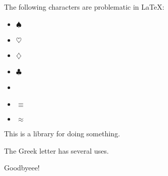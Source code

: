 \documentclass[letterpaper,10pt,english]{sphinxmanual}
\begin{document}
\cleardoublepage

The \hspace{0pt}following \hspace{0pt}characters \hspace{0pt}are \hspace{0pt}problematic \hspace{0pt}in \hspace{0pt}LaTeX:
\begin{itemize}
\item {}
 $\spadesuit$

\item {}
 $\heartsuit$

\item {}
 $\diamondsuit$

\item {}
 $\clubsuit$

\item {}
\textmu{}

\item {}
 $\equiv$

\item {}
 $\approx$

\end{itemize}

This is a \textmu{}\sphinxhyphen{}library for doing something.

The Greek letter \textmu{} has several uses.


\vspace{10px}


\clearpage


\vspace{30mm}


Goodbyeee!
\end{document}

